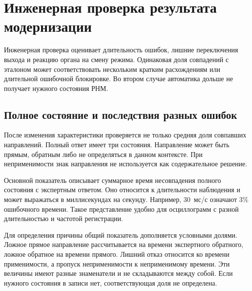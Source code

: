 \section{Инженерная проверка результата модернизации}
\label{sec:ch5_engineering_verification}

{}

Инженерная проверка оценивает длительность ошибок, лишние переключения выхода и реакцию
органа на смену режима. Одинаковая доля совпадений с эталоном может соответствовать
нескольким кратким расхождениям или длительной ошибочной блокировке. Во втором случае
автоматика дольше не получает нужного состояния РНМ.

\subsection{Полное состояние и последствия разных ошибок}

{}

После изменения характеристики проверяется
не только средняя доля совпавших направлений.
Полный ответ имеет три состояния.
Направление может быть прямым, обратным
либо не определяться в данном контексте.
При неприменимости знак направления не используется
как содержательное решение.

Основной показатель описывает суммарное время
несовпадения полного состояния с экспертным ответом.
Оно относится к длительности наблюдения
и может выражаться в миллисекундах на секунду.
Например, 30~мс/с означают 3\% ошибочного времени.
Такое представление удобно для осциллограмм
с разной длительностью и частотой регистрации.

Для определения причины общий показатель дополняется
условными долями. Ложное прямое направление
рассчитывается на времени экспертного обратного,
ложное обратное на времени прямого.
Лишний отказ относится ко времени применимости,
а пропуск неприменимости к неприменимому времени.
Эти величины имеют разные знаменатели
и не складываются между собой.
Если нужного состояния в записи нет,
соответствующая доля не определена.

